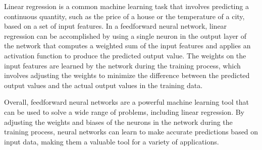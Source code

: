 \documentclass[a4paper, UKenglish, 11pt]{uiomaster}
\begin{document}
Linear regression is a common machine learning task that involves predicting a continuous quantity, such as the price of a house or the temperature of a city, based on a set of input features. In a feedforward neural network, linear regression can be accomplished by using a single neuron in the output layer of the network that computes a weighted sum of the input features and applies an activation function to produce the predicted output value. The weights on the input features are learned by the network during the training process, which involves adjusting the weights to minimize the difference between the predicted output values and the actual output values in the training data.

Overall, feedforward neural networks are a powerful machine learning tool that can be used to solve a wide range of problems, including linear regression. By adjusting the weights and biases of the neurons in the network during the training process, neural networks can learn to make accurate predictions based on input data, making them a valuable tool for a variety of applications.

%
%
%
%
\end{document}
